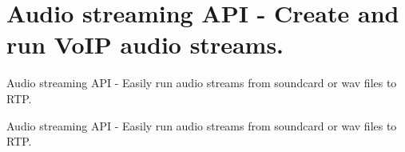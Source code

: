 \section{Audio streaming A\+PI -\/ Create and run Vo\+IP audio streams.}
\label{group__audio__stream__api}


Audio streaming A\+PI -\/ Easily run audio streams from soundcard or wav files to R\+TP.  


Audio streaming A\+PI -\/ Easily run audio streams from soundcard or wav files to R\+TP. 


